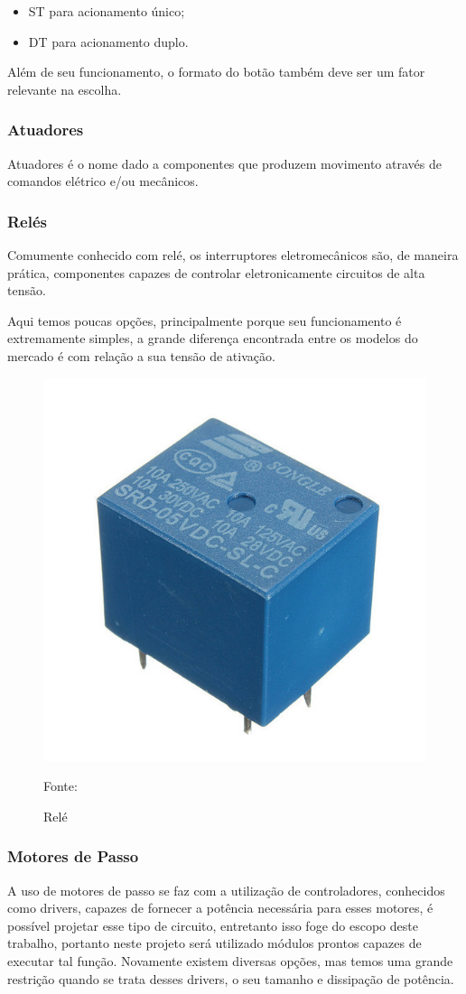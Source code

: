 \begin{itemize}
	\item ST para acionamento único;
	\item DT para acionamento duplo.
\end{itemize}

Além de seu funcionamento, o formato do botão também deve ser um fator relevante na escolha.

\subsubsection{Atuadores}

Atuadores é o nome dado a componentes que produzem movimento através de comandos elétrico e/ou mecânicos.

\subsubsection*{Relés}

Comumente conhecido com relé, os interruptores eletromecânicos são, de maneira prática, componentes capazes de controlar eletronicamente circuitos de alta tensão.

Aqui temos poucas opções, principalmente porque seu funcionamento é extremamente simples, a grande diferença encontrada entre os modelos do mercado é com relação a sua tensão de ativação.

\begin{figure}[h!]
  \centering
    \includegraphics[width=.3\textwidth]{figuras/rele.jpg}
    \caption{Relé} Fonte: \cite{FilipeFlop2019g}
    \label{fig:rele}
\end{figure}

\subsubsection*{Motores de Passo}

A uso de motores de passo se faz com a utilização de controladores, conhecidos como drivers, capazes de fornecer a potência necessária para esses motores, é possível projetar esse tipo de circuito, entretanto isso foge do escopo deste trabalho, portanto neste projeto será utilizado módulos prontos capazes de executar tal função. Novamente existem diversas opções, mas temos uma grande restrição quando se trata desses drivers, o seu tamanho e dissipação de potência.

